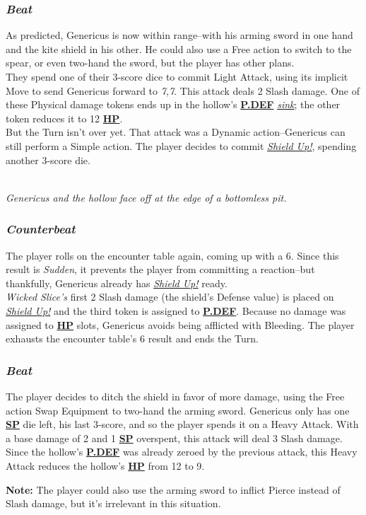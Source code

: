 \documentclass[12pt]{article}
\newcommand{\refto}[1]{\hyperlink{#1}{\textbf{#1}}}
\newcommand{\reftoit}[1]{\hyperlink{#1}{\emph{#1}}}
\begin{document}
\begin{multicols*}{2}
\subsubsection*{\emph{Beat}}
As predicted, Genericus is now within range--with his arming sword in one hand and the kite shield in his other. He could also use a Free action to switch to the spear, or even two-hand the sword, but the player has other plans.\\
They spend one of their 3-score dice to commit Light Attack, using its implicit Move to send Genericus forward to \emph{7,7}. This attack deals 2 Slash damage. One of these Physical damage tokens ends up in the hollow’s \refto{P.DEF} \reftoit{sink}; the other token reduces it to 12 \refto{HP}.\\
But the Turn isn’t over yet. That attack was a Dynamic action--Genericus can still perform a Simple action. The player decides to commit \reftoit{Shield Up!}, spending another 3-score die.
\begin{center}
\\
\emph{Genericus and the hollow face off at the edge of a bottomless pit.}
\end{center}
\subsubsection*{\emph{Counterbeat}}
The player rolls on the encounter table again, coming up with a 6. Since this result is \emph{Sudden}, it prevents the player from committing a reaction--but thankfully, Genericus already has \reftoit{Shield Up!} ready.\\
\emph{Wicked Slice’s} first 2 Slash damage (the shield’s Defense value) is placed on \reftoit{Shield Up!} and the third token is assigned to \refto{P.DEF}. Because no damage was assigned to \refto{HP} slots, Genericus avoids being afflicted with Bleeding. The player exhausts the encounter table’s 6 result and ends the Turn.
\subsubsection*{\emph{Beat}}
The player decides to ditch the shield in favor of more damage, using the Free action Swap Equipment to two-hand the arming sword. Genericus only has one \refto{SP} die left, his last 3-score, and so the player spends it on a Heavy Attack. With a base damage of 2 and 1 \refto{SP} overspent, this attack will deal 3 Slash damage.\\
Since the hollow’s \refto{P.DEF} was already zeroed by the previous attack, this Heavy Attack reduces the hollow’s \refto{HP} from 12 to 9.
\begin{tcolorbox}
\textbf{Note:} The player could also use the arming sword to inflict Pierce instead of Slash damage, but it’s irrelevant in this situation.
\end{tcolorbox}

\end{multicols*}
\end{document}
